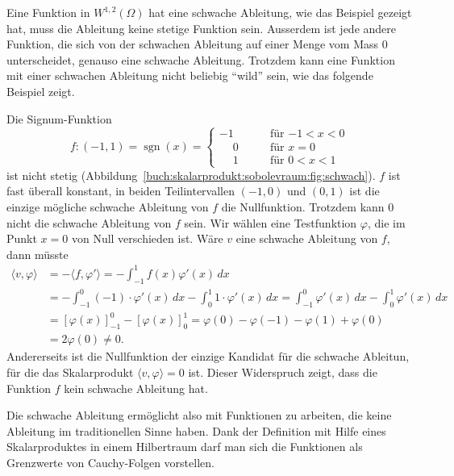 Eine Funktion in $W^{1,2}(\Omega)$ hat eine schwache Ableitung,
wie das Beispiel gezeigt hat, muss die Ableitung keine stetige
Funktion sein.
Ausserdem ist jede andere Funktion, die sich von der schwachen
Ableitung auf einer Menge vom Mass 0 unterscheidet, genauso eine
schwache Ableitung.
Trotzdem kann eine Funktion mit einer schwachen Ableitung nicht
beliebig ``wild'' sein, wie das folgende Beispiel zeigt.

\begin{beispiel}
\label{buch:skalarprodukt:sobolevraum:bsp:schwachexistiertnicht}
Die Signum-Funktion
\[
f\colon (-1,1) = \operatorname{sgn}(x) =
\begin{cases}
         - 1&\qquad\text{für $-1<x<0$}\\
\phantom{-}0&\qquad\text{für $x=0$}\\
\phantom{-}1&\qquad\text{für $0<x<1$}
\end{cases}
\]
ist nicht stetig (Abbildung~\ref{buch:skalarprodukt:sobolevraum:fig:schwach}).
$f$ ist fast überall konstant, in beiden Teilintervallen $(-1,0)$ und
$(0,1)$ ist die einzige mögliche schwache Ableitung von $f$ die
Nullfunktion.
Trotzdem kann $0$ nicht die schwache Ableitung von $f$ sein.
Wir wählen eine Testfunktion $\varphi$, die im Punkt $x=0$ von
Null verschieden ist.
Wäre $v$ eine schwache Ableitung von $f$, dann müsste
\begin{align*}
\langle v,\varphi\rangle
&=
-\langle f,\varphi'\rangle
=
-\int_{-1}^1 f(x) \varphi'(x)\,dx
\\
&=
-\int_{-1}^0 (-1)\cdot \varphi'(x)\,dx
-\int_{0}^1 1\cdot \varphi'(x)\,dx
=
\int_{-1}^0 \varphi'(x)\,dx
-
\int_{0}^1 \varphi'(x)\,dx
\\
&=
[\varphi(x)]_{-1}^0
-
[\varphi(x)]_{0}^1
=
\varphi(0)-\varphi(-1)
-
\varphi(1)+\varphi(0)
\\
&=
2\varphi(0)
\ne 0.
\end{align*}
Andererseits ist die Nullfunktion der einzige Kandidat für die
schwache Ableitun, für die das Skalarprodukt $\langle v,\varphi\rangle=0$
ist.
Dieser Widerspruch zeigt, dass die Funktion $f$ kein schwache
Ableitung hat.
\end{beispiel}

Die schwache Ableitung ermöglicht also mit Funktionen zu arbeiten,
die keine Ableitung im traditionellen Sinne haben.
Dank der Definition mit Hilfe eines Skalarproduktes in einem 
Hilbertraum darf man sich die Funktionen als Grenzwerte von
Cauchy-Folgen vorstellen.

%
%
